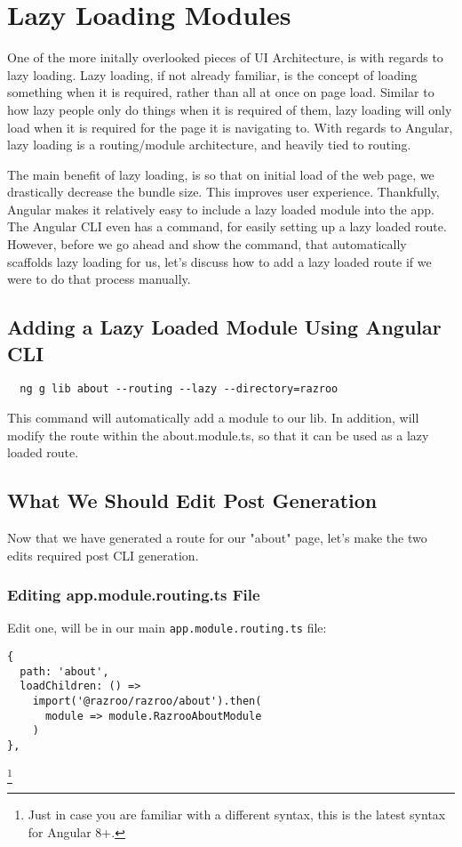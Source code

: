 
\chapter{ Lazy Loading Modules }
One of the more initally overlooked pieces of UI Architecture, is with regards to 
lazy loading. Lazy loading, if not already familiar, is the concept of loading
something when it is required, rather than all at once on page load. Similar to 
how lazy people only do things when it is required of them, lazy loading will 
only load when it is required for the page it is navigating to. With regards to Angular,
lazy loading is a routing/module architecture, and heavily tied to routing. 

The main benefit of lazy loading, is so that on initial load of the web page, we
drastically decrease the bundle size. This improves user experience. Thankfully, Angular 
makes it relatively easy to include a lazy loaded module into the app. The Angular CLI 
even has a command, for easily setting up a lazy loaded route. However, before we go 
ahead and show the command, that automatically scaffolds lazy loading for us, let's discuss
how to add a lazy loaded route if we were to do that process manually. 

\section{Adding a Lazy Loaded Module Using Angular CLI}
\begin{verbatim}
  ng g lib about --routing --lazy --directory=razroo
\end{verbatim}

This command will automatically add a module to our lib. In addition, will 
modify the route within the about.module.ts, so that it can be used as a
lazy loaded route. 

\section{What We Should Edit Post Generation}
Now that we have generated a route for our "about" page, let's make the two 
edits required post CLI generation. 

\subsection{Editing app.module.routing.ts File}
Edit one, will be in our main \lstinline{app.module.routing.ts} file:
\begin{lstlisting}
{
  path: 'about',
  loadChildren: () =>  
    import('@razroo/razroo/about').then(
      module => module.RazrooAboutModule
    )
},
\end{lstlisting}
\footnote{Just in case you are familiar with a different syntax, this is the 
latest syntax for Angular 8+.}

